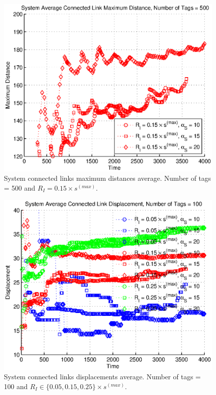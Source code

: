 \begin{figure}
\centering
\includegraphics[width=5in]{Chapter_4_Figures/sys_links_max_dist_500tags_15diam.eps}
\caption{System connected links maximum distances average. Number of tags = 500 and $R_I = 0.15 \times s^{(max)}$.}
\label{Figure: sys_links_max_dist_500tags_15diam.eps}
\end{figure}
\begin{figure}
\centering
\includegraphics[width=5in]{Chapter_4_Figures/sys_links_disp_100tags_all.eps}
\caption{System connected links displacements average. Number of tags = 100 and $R_I \in \{0.05, 0.15, 0.25\} \times s^{(max)}$.}
\label{Figure: sys_links_disp_100tags_all.eps}
\end{figure}
\clearpage

